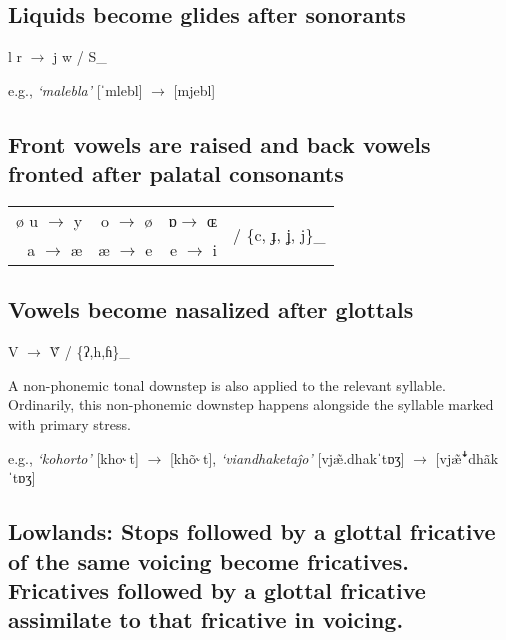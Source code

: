 \documentclass[a4paper,11pt,article,oneside]{memoir}
\newcommand{\bripa}[1]{[#1]}
\newcommand{\espq}[1]{\textit{`#1'}}
\newcommand{\ezh}{ʒ}
\newcommand{\paljstop}{ɟ}
\newcommand{\paljfric}{ʝ}
\newcommand{\glotstop}{ʔ}
\newcommand{\voih}{ɦ}
\newcommand{\aesh}{æ}
\newcommand{\oesh}{ɶ}
\newcommand{\ahoh}{ɒ}
\newcommand{\rhot}{˞}
\newcommand{\prstr}{ˈ}
\newcommand{\downstep}{ꜜ}
\begin{document}
\subsection{Liquids become glides after sonorants}

\begin{center}
    l r $\to$ j w / S\_
\end{center}

e.g., \espq{malebla} \bripa{\prstr mlebl} $\to$ \bripa{mjebl}

\subsection{Front vowels are raised and back vowels fronted after palatal consonants}

\begin{center}
    \begin{tabular}{@{}rrrl@{}}
        ø u $\to$ y & o $\to$ ø & \ahoh $\to$ \oesh  & \multirow{2}{*}{/ \{c, \paljstop, \paljfric, j\}\_} \\
         a $\to$ \aesh & \aesh{} $\to$ e & e $\to$ i & 
    \end{tabular}
\end{center}

\subsection{Vowels become nasalized after glottals}

\begin{center}
    V $\to$ \~{V} / \{\glotstop,h,\voih\}\_
\end{center}

A non-phonemic tonal downstep is also applied to the relevant syllable. Ordinarily, this non-phonemic downstep happens alongside the syllable marked with primary stress.

e.g., \espq{kohorto} \bripa{kho\rhot\,t} $\to$ \bripa{kh\~{o}\rhot\,t}, \espq{viandhaketa\^{j}o} \bripa{vj\~{\aesh}.dhak\prstr t\ahoh\ezh} $\to$ \bripa{vj\~{\aesh}\downstep dh\~{a}k\prstr t\ahoh\ezh}

\subsection{{\sc Lowlands:} Stops followed by a glottal fricative of the same voicing become fricatives. Fricatives followed by a glottal fricative assimilate to that fricative in voicing.}
\end{document}

